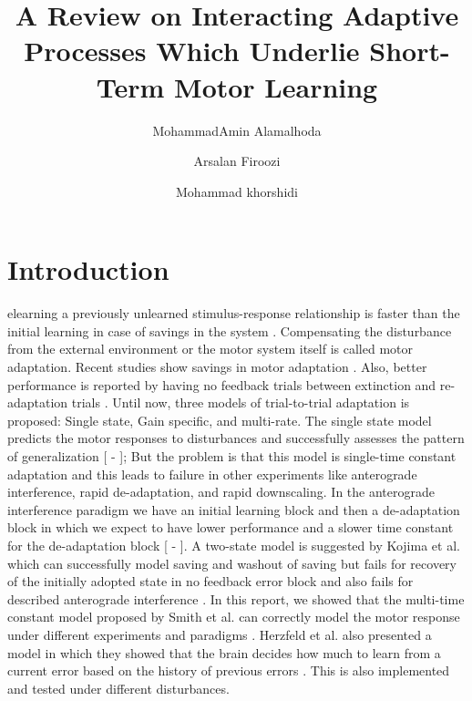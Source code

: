 \documentclass[9pt,twocolumn]{paper-template}
\title{A Review on Interacting Adaptive Processes Which Underlie Short-Term Motor Learning}
\author[a]{MohammadAmin Alamalhoda}
\author[a]{Arsalan Firoozi}
\author[a]{Mohammad khorshidi}
\affil[a]{Student, EE Department, Sharif University of Technology}
\begin{document}
\maketitle
\thispagestyle{firststyle}

\section*{Introduction}
elearning a previously unlearned stimulus-response relationship is faster than the initial learning in case of savings in the system \cite{main_paper}. Compensating the disturbance from the external environment or the motor system itself is called motor adaptation. Recent studies show savings in motor adaptation \cite{Kojima}. Also, better performance is reported by having no feedback trials between extinction and re-adaptation trials \cite{Kojima}. 
Until now, three models of trial-to-trial adaptation is proposed: Single state, Gain specific, and multi-rate. The single state model predicts the motor responses to disturbances and successfully assesses the pattern of generalization [\cite{Scheidt} - \cite{Donchin}]; But the problem is that this model is single-time constant adaptation and this leads to failure in other experiments like anterograde interference, rapid de-adaptation, and rapid downscaling. In the anterograde interference paradigm we have an initial learning block and then a de-adaptation block in which we expect to have lower performance and a slower time constant for the de-adaptation block [\cite{Bizzi} - \cite{Wolpert}]. A two-state model is suggested by Kojima et al. which can successfully model saving and washout of saving but fails for recovery of the initially adopted state in no feedback error block and also fails for described anterograde interference \cite{Kojima}.
In this report, we showed that the multi-time constant model proposed by Smith et al. can correctly model the motor response under different experiments and paradigms \cite{main_paper}. Herzfeld et al. also presented a model in which they showed that the brain decides how much to learn from a current error based on the history of previous errors \cite{mem_error}. This is also implemented and tested under different disturbances.\\
\end{document}
